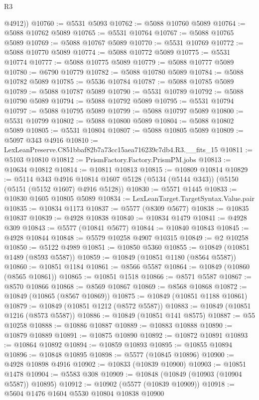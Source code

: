 \begin{lexlean}{R3}
\begin{coremodule}
        @4912))
@10760 := @5531 @5093
@10762 := @5088 @10760 @5089
@10764 := @5088 @10762 @5089
@10765 := @5531 @10764
@10767 := @5088 @10765 @5089
@10769 := @5088 @10767 @5089
@10770 := @5531 @10769
@10772 := @5088 @10770 @5089
@10774 := @5088 @10772 @5089
@10775 := @5531 @10774
@10777 := @5088 @10775 @5089
@10779 := @5088 @10777 @5089
@10780 := @6790 @10779
@10782 := @5088 @10780 @5089
@10784 := @5088 @10782 @5089
@10785 := @5536 @10784
@10787 := @5088 @10785 @5089
@10789 := @5088 @10787 @5089
@10790 := @5531 @10789
@10792 := @5088 @10790 @5089
@10794 := @5088 @10792 @5089
@10795 := @5531 @10794
@10797 := @5088 @10795 @5089
@10799 := @5088 @10797 @5089
@10800 := @5531 @10799
@10802 := @5088 @10800 @5089
@10804 := @5088 @10802 @5089
@10805 := @5531 @10804
@10807 := @5088 @10805 @5089
@10809 := @5097 @343 @4916
@10810 := LexLeanPreserve.C851bbaf82b7a73cc15aea716239c7db4.R3.__fits_15
@10811 := @5103 @10810
@10812 := PrismFactory.Factory.PrismPM.jobs
@10813 := @10634 @10812
@10814 := @10811 @10813
@10815 := @10809 @10814
@10829 := @5114
    @343
    @4916
    @10814
    @1607
    @5128
    (@5134 (@5144 @343))
    (@5150 (@5151 (@5152 @1607) @4916 @5128))
@10830 := @5571 @1445
@10833 := @10830 @1605 @10805 @5089
@10834 := LexLeanTarget.TargetSyntax.Value.pair
@10835 := @10834 @1173
@10837 := @5577 (@8309 @5677)
@10838 := @10835 @10837
@10839 := @4928 @10838
@10840 := @10834 @1479
@10841 := @4928 @309
@10843 := @5577 (@10841 @5677)
@10844 := @10840 @10843
@10845 := @4928 @10844
@10848 := @5579 @10258 @4907 @10315
@10849 := @2 @10258
@10850 := @5122 @4989
@10851 := @10850 @5360
@10855 := @10849 (@10851 @1489 (@8593 @5587))
@10859 := @10849 (@10851 @1180 (@8564 @5587))
@10860 := @10851 @1184
@10861 := @8566 @5587
@10864 := @10849 (@10860 (@8565 @10861))
@10865 := @10851 @1518
@10866 := @8571 @5587
@10867 := @8570 @10866
@10868 := @8569 @10867
@10869 := @8568 @10868
@10872 := @10849 (@10865 (@8567 @10869))
@10875 := @10849 (@10851 @1188 @10861)
@10879 := @10849 (@10851 @1212 (@8572 @5587))
@10883 := @10849 (@10851 @1216 (@8573 @5587))
@10886 := @10849 (@10851 @141 @8575)
@10887 := @55 @10258
@10888 := @10886 @10887
@10889 := @10883 @10888
@10890 := @10879 @10889
@10891 := @10875 @10890
@10892 := @10872 @10891
@10893 := @10864 @10892
@10894 := @10859 @10893
@10895 := @10855 @10894
@10896 := @10848 @10895
@10898 := @5577 (@10845 @10896)
@10900 := @4928 @10898 @4916
@10902 := @10833 (@10839 @10900)
@10903 := @10851 @1478
@10904 := @5583 @308
@10909 := @10848 (@10849 (@10903 (@10904 @5587)) @10895)
@10912 := @10902 (@5577 (@10839 @10909))
@10918 := @5604 @1476 @1604 @5530 @10804 @10838 @10900

\end{coremodule}
\end{lexlean}
